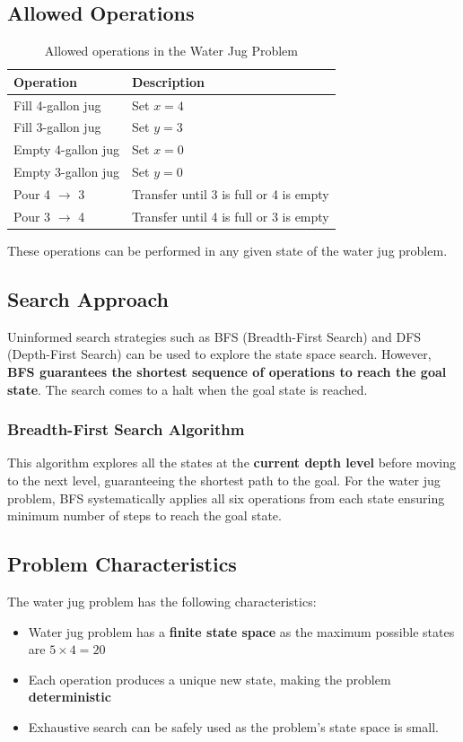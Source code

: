 \documentclass[12pt,a4paper]{report}
\begin{document}
\subsection{Allowed Operations}
\begin{table}[H]
    \centering
    \begin{tabular}{@{}ll@{}}
    \toprule
    \textbf{Operation} & \textbf{Description} \\
    \midrule
    Fill 4-gallon jug   & Set $x = 4$ \\
    Fill 3-gallon jug   & Set $y = 3$ \\
    Empty 4-gallon jug  & Set $x = 0$ \\
    Empty 3-gallon jug  & Set $y = 0$ \\
    Pour 4 $\to$ 3      & Transfer until 3 is full or 4 is empty \\
    Pour 3 $\to$ 4      & Transfer until 4 is full or 3 is empty \\
    \bottomrule
    \end{tabular}
    \caption{Allowed operations in the Water Jug Problem}
\end{table}
These operations can be performed in any given state of the water jug problem.

\subsection{Search Approach}
Uninformed search strategies such as BFS (Breadth-First Search) and DFS (Depth-First Search) can be used to explore the state space search.
However, \textbf{BFS guarantees the shortest sequence of operations to reach the goal state}.
The search comes to a halt when the goal state is reached.

\subsubsection{Breadth-First Search Algorithm}
This algorithm explores all the states at the \textbf{current depth level} before moving to the
next level, guaranteeing the shortest path to the goal. For the water jug problem, BFS systematically
applies all six operations from each state ensuring minimum number of steps to reach the goal state.


\subsection{Problem Characteristics}
The water jug problem has the following characteristics:
\begin{itemize}
    \item Water jug problem has a \textbf{finite state space} as the maximum possible states are $5 \times 4 = 20$
    \item Each operation produces a unique new state, making the problem \textbf{deterministic}
    \item Exhaustive search can be safely used as the problem's state space is small.
\end{itemize}
\end{document}
